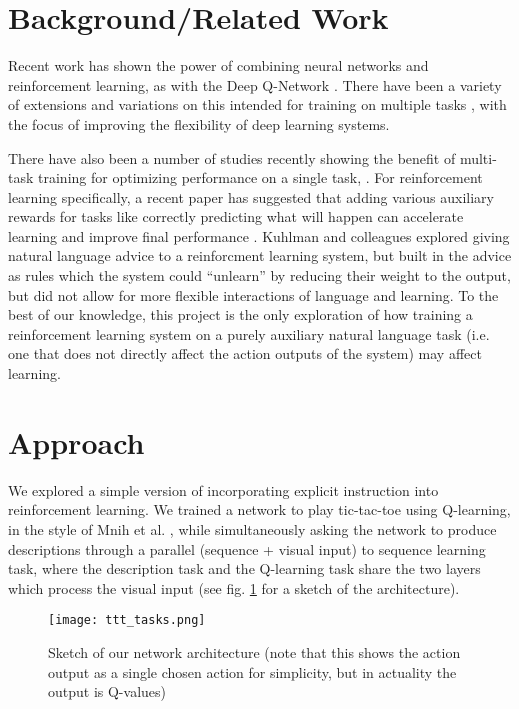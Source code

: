 \documentclass{article} %
\begin{document}
\section{Background/Related Work}
Recent work has shown the power of combining neural networks and reinforcement learning, as with the Deep Q-Network \cite{Mnih2015}. There have been a variety of extensions and variations on this intended for training on multiple tasks \cite[e.g.]{Rusu2015}, with the focus of improving the flexibility of deep learning systems. \par 
There have also been a number of studies recently showing the benefit of multi-task training for optimizing performance on a single task, \cite[e.g.]{Luong2016}. For reinforcement learning specifically, a recent paper has suggested that adding various auxiliary rewards for tasks like correctly predicting what will happen can accelerate learning and improve final performance \cite{Jaderberg2016}. Kuhlman and colleagues \cite{Kuhlmann2004} explored giving natural language advice to a reinforcment learning system, but built in the advice as rules which the system could ``unlearn'' by reducing their weight to the output, but did not allow for more flexible interactions of language and learning. To the best of our knowledge, this project is the only exploration of how training a reinforcement learning system on a purely auxiliary natural language task (i.e. one that does not directly affect the action outputs of the system) may affect learning.
\section{Approach}
We explored a simple version of incorporating explicit instruction into reinforcement learning. We trained a network to play tic-tac-toe using Q-learning, in the style of Mnih et al. \cite{Mnih2015}, while simultaneously asking the network to produce descriptions through a parallel (sequence + visual input) to sequence learning task, where the description task and the Q-learning task share the two layers which process the visual input (see fig. \ref{network_diagram} for a sketch of the architecture). \par 
\begin{figure}
\centering
\texttt{[image: ttt\_tasks.png]}
\caption{Sketch of our network architecture (note that this shows the action output as a single chosen action for simplicity, but in actuality the output is Q-values)}
\label{network_diagram}
\end{figure}
\end{document}
